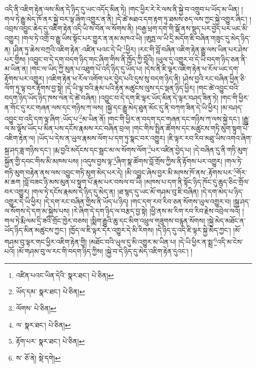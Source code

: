 འདི་ནི་འཇིག་རྟེན་ལས་མིན་དེ་ཉིད་དུ་ཡང་འདོད་མིན་ཏེ། །གང་ཕྱིར་རེ་རེ་ལས་ནི་སྐྱེ་བ་འགྲུབ་པ་ཡོད་མ་ཡིན། །གལ་ཏེ་རྒྱུ་མེད་ཁོ་ནར་སྐྱེ་བར་ལྟ་ཞིག་འགྱུར་ན་ནི། །དེ་ཚེ་མཐའ་དག་རྟག་ཏུ་ཐམས་ཅད་ལས་ཀྱང་སྐྱེ་འགྱུར་ཞིང་། །འབྲས་འབྱུང་ཆེད་དུ་འཇིག་རྟེན་འདི་ཡི་ས་བོན་ལ་སོགས་ནི། །བརྒྱ་ཕྲག་དག་གི་སྒོ་ནས་སྡུད་པར་བྱེད་པར་ཡང་མི་འགྱུར། །གལ་ཏེ་འགྲོ་བ་རྒྱུ་ཡིས་སྟོང་པར་གྱུར་ན་ནམ་མཁའ་ཡི། །ཨུཏྤ་ལ་ཡི་དྲི་མདོག་ཇི་བཞིན་གཟུང་དུ་མེད་ཉིད་ན། །ཤིན་ཏུ་ཆེས་བཀྲའི་འཇིག་རྟེན་:འཛིན་པའང་དེ་ཡི་\footnote{འཛིན་པའང་ཡིན་དེའི་  སྣར་ཐང་།  པེ་ཅིན། }ཕྱིར། །རང་གི་བློ་བཞིན་འཇིག་རྟེན་རྒྱུ་ལས་ཡིན་པར་ཤེས་པར་གྱིས། །འབྱུང་བ་དེ་དག་བདག་ཉིད་གང་ཞིག་གིས་ནི་ཁྱོད་ཀྱི་བློའི། །ཡུལ་དུ་འགྱུར་བ་དེ་ཡི་བདག་ཉིད་ཅན་ནི་མ་ཡིན་ན། །གང་ལ་ཡིད་ཀྱི་མུན་པ་འཐུག་པོ་འདི་ཉིད་དུ་ཡོད་པ། །དེས་ནི་ཇི་ལྟར་འཇིག་རྟེན་ཕ་རོལ་ཡང་དག་རྟོགས་པར་འགྱུར། །འཇིག་རྟེན་ཕ་རོལ་འགོག་པར་བྱེད་པའི་དུས་སུ་བདག་ཉིད་ནི། །ཤེས་བྱའི་རང་བཞིན་ཕྱིན་ཅི་ལོག་ཏུ་ལྟ་བར་རྟོགས་བྱ་སྟེ། །དེ་ཡི་ལྟ་བའི་རྣམ་པའི་རྟེན་མཚུངས་ལུས་དང་ལྡན་ཉིད་ཕྱིར། །གང་ཚེ་འབྱུང་བའི་བདག་ཉིད་ཡོད་ཉིད་ཁས་ལེན་དེ་ཚེ་བཞིན། །འབྱུང་བ་དེ་དག་ཇི་ལྟར་ཡོད་མིན་དེ་ལྟར་བཤད་ཟིན་ཏེ། །གང་གི་ཕྱིར་ན་གོང་དུ་རང་གཞན་ལས་དང་གཉིས་ཀ་ལས། །སྐྱེ་དང་རྒྱུ་མེད་ཐུན་མོང་དུ་ནི་བཀག་ཟིན་དེ་ཡི་ཕྱིར། །མ་བཤད་འབྱུང་བ་འདི་དག་ལྟ་ཞིག་:ཡོད་པ་\footnote{ཡོད་དམ་  སྣར་ཐང་།  པེ་ཅིན། }མ་ཡིན་ནོ། །གང་གི་ཕྱིར་ན་བདག་དང་གཞན་དང་གཉིས་ཀ་ལས་སྐྱེ་དང་། །རྒྱུ་ལ་མ་ལྟོས་ཡོད་པ་མིན་པས་དངོས་རྣམས་རང་བཞིན་བྲལ། །གང་གིས་སྤྲིན་ཚོགས་དང་མཚུངས་གཏི་མུག་སྟུག་པོ་འཇིག་རྟེན་ལ། །ཡོད་པ་དེས་ན་ཡུལ་རྣམས་ལོག་པ་དག་ཏུ་སྣང་བར་འགྱུར། །ཇི་ལྟར་རབ་རིབ་མཐུ་ཡིས་འགའ་ཞིག་སྐྲ་ཤད་ཟླ་གཉིས་དང་། །རྨ་བྱའི་མདོངས་དང་སྦྲང་མ་ལ་སོགས་ལོག་\footnote{ལོགས་  པེ་ཅིན། }པར་འཛིན་བྱེད་པ། །དེ་བཞིན་དུ་ནི་གཏི་མུག་སྐྱོན་གྱི་དབང་གིས་མི་མཁས་པས། །འདུས་བྱས་ལྟ་\footnote{ལ་  སྣར་ཐང་།  པེ་ཅིན། }ཞིག་སྣ་ཚོགས་བློ་གྲོས་ཀྱིས་ནི་རྟོགས་པར་འགྱུར། །གལ་ཏེ་གཏི་མུག་བརྟེན་ནས་ལས་འབྱུང་གཏི་མུག་མེད་པར་དེ། །མི་འབྱུང་ཞེས་བྱར་མི་མཁས་ཁོ་ནས་:རྟོགས་པར་\footnote{རྟོག་པར་  སྣར་ཐང་།  པེ་ཅིན། }གོར་མ་ཆག །བློ་བཟང་ཉི་མས་མུན་པ་སྟུག་པོ་རྣམ་པར་བསལ་བ་ཡི། །མཁས་པ་དག་ནི་སྟོང་ཉིད་ཁོང་དུ་ཆུད་ཅིང་གྲོལ་བར་འགྱུར། །གལ་ཏེ་དངོས་རྣམས་དེ་ཉིད་དུ་མེད་ན། །ཐ་སྙད་དུ་ཡང་མོ་གཤམ་བུ་ཇི་བཞིན། །དེ་དག་མེད་པ་ཉིད་འགྱུར་དེ་ཡི་ཕྱིར། །དེ་དག་རང་བཞིན་གྱིས་ནི་ཡོད་པ་ཉིད། །གང་དག་རབ་རིབ་ཅན་སོགས་ཡུལ་འགྱུར་བ། །སྐྲ་ཤད་ལ་སོགས་དེ་དག་མ་སྐྱེས་པས། །རེ་ཞིག་དེ་དག་ཉིད་ལ་བརྩད་བྱ་སྟེ། །ཕྱི་ནས་མ་རིག་རབ་རིབ་རྗེས་འབྲེལ་ལའོ། །གལ་ཏེ་རྨི་ལམ་དྲི་ཟའི་གྲོང་ཁྱེར་བཅས། །སྨིག་རྒྱུའི་ཆུ་དང་མིག་འཕྲུལ་གཟུགས་བརྙན་སོགས། །སྐྱེ་མེད་མཐོང་ན་ཡོད་ཉིད་མིན་མཚུངས་ཀྱང་། །ཁྱོད་ལ་ཇི་ལྟར་དེར་འགྱུར་དེ་མི་རིགས། །དེ་ཉིད་དུ་འདི་ཇི་ལྟར་སྐྱེ་མེད་ཀྱང་། །མོ་གཤམ་བུ་ལྟར་གང་ཕྱིར་འཇིག་རྟེན་གྱི། །མཐོང་བའི་ཡུལ་དུ་མི་འགྱུར་མ་ཡིན་པ། །དེ་ཡི་ཕྱིར་ན་སྨྲ་\footnote{ས་  ཅོ་ནེ།  སྡེ་དགེ། }འདི་མ་ངེས་པའོ། །མོ་གཤམ་བུ་ལ་རང་གི་བདག་ཉིད་ཀྱིས། །སྐྱེ་བ་དེ་ཉིད་དུ་མེད་འཇིག་རྟེན་དུའང་། །
